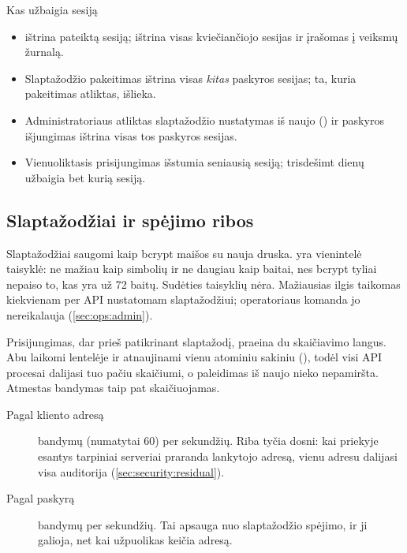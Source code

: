 \begin{codebox}{Kas užbaigia sesiją}
\begin{itemize}
  \item {} ištrina pateiktą sesiją;
     ištrina visas kviečiančiojo sesijas ir įrašomas į
    veiksmų žurnalą.
  \item Slaptažodžio pakeitimas ištrina visas \emph{kitas} paskyros sesijas; ta, kuria
    pakeitimas atliktas, išlieka.
  \item Administratoriaus atliktas slaptažodžio nustatymas iš naujo
    () ir paskyros išjungimas ištrina visas tos
    paskyros sesijas.
  \item Vienuoliktasis prisijungimas išstumia seniausią sesiją; trisdešimt dienų užbaigia bet
    kurią sesiją.
\end{itemize}
\end{codebox}

\subsection{Slaptažodžiai ir spėjimo ribos}

Slaptažodžiai saugomi kaip bcrypt maišos su nauja druska.  yra
vienintelė taisyklė: ne mažiau kaip  \code{=}  simbolių ir ne
daugiau kaip  \code{=}  baitai, nes bcrypt tyliai nepaiso to, kas
yra už 72 baitų. Sudėties taisyklių nėra. Mažiausias ilgis taikomas kiekvienam per API nustatomam
slaptažodžiui; operatoriaus komanda  jo nereikalauja
(\cref{sec:ops:admin}).

Prisijungimas, dar prieš patikrinant slaptažodį, praeina du skaičiavimo langus. Abu laikomi
lentelėje  ir atnaujinami vienu atominiu sakiniu
(), todėl visi API procesai dalijasi tuo pačiu skaičiumi, o
paleidimas iš naujo nieko nepamiršta. Atmestas bandymas taip pat skaičiuojamas.

\begin{description}
  \item[Pagal kliento adresą]  bandymų (numatytai 60) per
     \code{=}  sekundžių. Riba tyčia dosni: kai priekyje
    esantys tarpiniai serveriai praranda lankytojo adresą, vienu adresu dalijasi visa
    auditorija (\cref{sec:security:residual}).
  \item[Pagal paskyrą]  \code{=}  bandymų per 
    \code{=}  sekundžių. Tai apsauga nuo slaptažodžio spėjimo, ir ji galioja, net
    kai užpuolikas keičia adresą.
\end{description}

